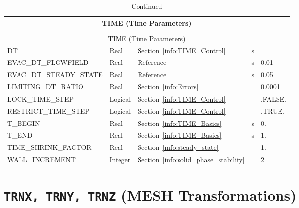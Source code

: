 \documentclass[11pt]{book}
\begin{document}
\begin{longtable}{@{\extracolsep{\fill}}|l|l|l|l|l|}
\caption[Time parameters ({\ct TIME} namelist group)]{For more information see Section~\ref{info:TIME}.}
\label{tbl:TIME} \\
\hline
\multicolumn{5}{|c|}{{\ct TIME} (Time Parameters)} \\
\hline \hline
\endfirsthead
\caption[]{Continued} \\
\hline
\multicolumn{5}{|c|}{{\ct TIME} (Time Parameters)} \\
\hline \hline
\endhead
{\ct DT}                        & Real       & Section~\ref{info:TIME_Control}           & s           &                 \\ \hline
{\ct EVAC\_DT\_FLOWFIELD}       & Real       & Reference~\cite{FDS_Evac_Users_Guide}     & s           &  0.01           \\ \hline
{\ct EVAC\_DT\_STEADY\_STATE}   & Real       & Reference~\cite{FDS_Evac_Users_Guide}     & s           &  0.05           \\ \hline
{\ct LIMITING\_DT\_RATIO}       & Real       & Section~\ref{info:Errors}                 &               &  0.0001         \\ \hline
{\ct LOCK\_TIME\_STEP}          & Logical    & Section~\ref{info:TIME_Control}           &             & {\ct .FALSE.}   \\ \hline
{\ct RESTRICT\_TIME\_STEP}      & Logical    & Section~\ref{info:TIME_Control}           &             & {\ct .TRUE.}    \\ \hline
{\ct T\_BEGIN}                  & Real       & Section~\ref{info:TIME_Basics}            & s           & 0.              \\ \hline
{\ct T\_END}                    & Real       & Section~\ref{info:TIME_Basics}            & s           & 1.              \\ \hline
{\ct TIME\_SHRINK\_FACTOR}      & Real       & Section~\ref{info:steady_state}           &             & 1.              \\ \hline
{\ct WALL\_INCREMENT}           & Integer    & Section~\ref{info:solid_phase_stability}  &             & 2               \\ \hline
\end{longtable}

\vspace{\baselineskip}

\section{\texorpdfstring{{\tt TRNX, TRNY, TRNZ}}{TRNX, TRNY, TRNZ} (MESH Transformations)}
\end{document}
